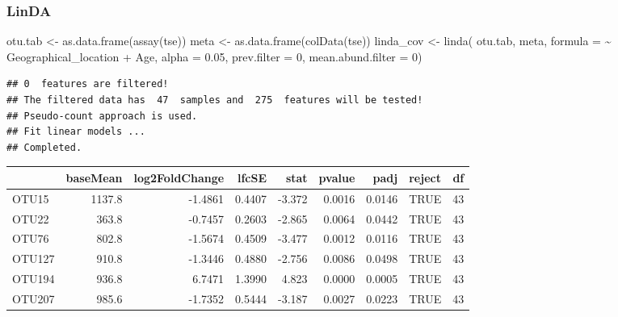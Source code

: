 \documentclass[
]{book}
\newenvironment{Shaded}{\begin{snugshade}}{\end{snugshade}}
\newcommand{\AttributeTok}[1]{\textcolor[rgb]{0.77,0.63,0.00}{#1}}
\newcommand{\DecValTok}[1]{\textcolor[rgb]{0.00,0.00,0.81}{#1}}
\newcommand{\FloatTok}[1]{\textcolor[rgb]{0.00,0.00,0.81}{#1}}
\newcommand{\FunctionTok}[1]{\textcolor[rgb]{0.00,0.00,0.00}{#1}}
\newcommand{\NormalTok}[1]{#1}
\newcommand{\OtherTok}[1]{\textcolor[rgb]{0.56,0.35,0.01}{#1}}
\newcommand{\SpecialCharTok}[1]{\textcolor[rgb]{0.00,0.00,0.00}{#1}}
\newcommand{\StringTok}[1]{\textcolor[rgb]{0.31,0.60,0.02}{#1}}
\begin{document}
\hypertarget{linda-1}{%
\subsubsection{LinDA}\label{linda-1}}

\begin{Shaded}
\begin{Highlighting}[]
\NormalTok{otu.tab }\OtherTok{\textless{}{-}} \FunctionTok{as.data.frame}\NormalTok{(}\FunctionTok{assay}\NormalTok{(tse))}
\NormalTok{meta }\OtherTok{\textless{}{-}} \FunctionTok{as.data.frame}\NormalTok{(}\FunctionTok{colData}\NormalTok{(tse))}
\NormalTok{linda\_cov }\OtherTok{\textless{}{-}} \FunctionTok{linda}\NormalTok{(}
\NormalTok{  otu.tab, }
\NormalTok{  meta, }
  \AttributeTok{formula =} \StringTok{\textquotesingle{}\textasciitilde{} Geographical\_location + Age\textquotesingle{}}\NormalTok{, }
  \AttributeTok{alpha =} \FloatTok{0.05}\NormalTok{, }
  \AttributeTok{prev.filter =} \DecValTok{0}\NormalTok{, }
  \AttributeTok{mean.abund.filter =} \DecValTok{0}\NormalTok{)}
\end{Highlighting}
\end{Shaded}

\begin{verbatim}
## 0  features are filtered!
## The filtered data has  47  samples and  275  features will be tested!
## Pseudo-count approach is used.
## Fit linear models ...
## Completed.
\end{verbatim}

\begin{Shaded}
\end{Shaded}

\begin{tabular}{l|r|r|r|r|r|r|l|r}
\hline
  & baseMean & log2FoldChange & lfcSE & stat & pvalue & padj & reject & df\\
\hline
OTU15 & 1137.8 & -1.4861 & 0.4407 & -3.372 & 0.0016 & 0.0146 & TRUE & 43\\
\hline
OTU22 & 363.8 & -0.7457 & 0.2603 & -2.865 & 0.0064 & 0.0442 & TRUE & 43\\
\hline
OTU76 & 802.8 & -1.5674 & 0.4509 & -3.477 & 0.0012 & 0.0116 & TRUE & 43\\
\hline
OTU127 & 910.8 & -1.3446 & 0.4880 & -2.756 & 0.0086 & 0.0498 & TRUE & 43\\
\hline
OTU194 & 936.8 & 6.7471 & 1.3990 & 4.823 & 0.0000 & 0.0005 & TRUE & 43\\
\hline
OTU207 & 985.6 & -1.7352 & 0.5444 & -3.187 & 0.0027 & 0.0223 & TRUE & 43\\
\hline
\end{tabular}
\end{document}
